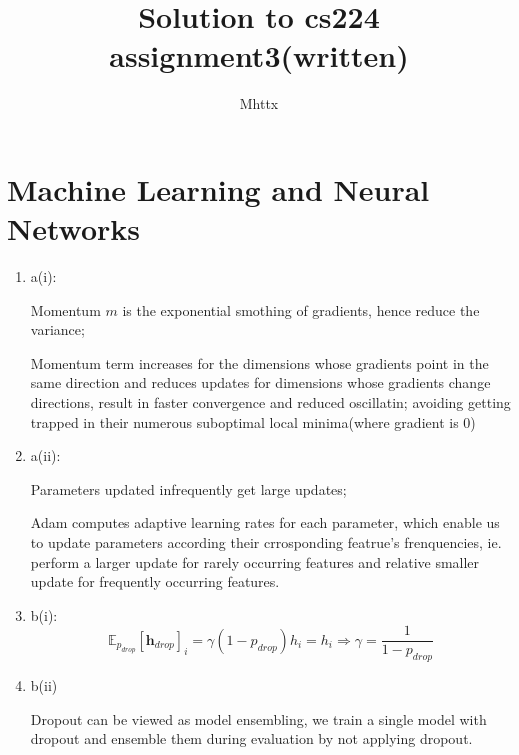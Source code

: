 \documentclass[a4paper]{article}
\begin{document}
\author{Mhttx}
\title{Solution to cs224 assignment3(written)}
\maketitle

\medskip
\section{Machine Learning and  Neural Networks}
\begin{enumerate}
	\item a(i): 

	Momentum $m$ is the exponential smothing of gradients, hence reduce the variance;

	Momentum term increases for the dimensions whose gradients point in the same direction and reduces updates for dimensions whose gradients change directions, result in faster convergence and reduced oscillatin; avoiding getting trapped in their numerous suboptimal local minima(where gradient is 0)

	\item a(ii): 

	Parameters updated infrequently get large updates; 

	Adam computes adaptive learning rates for each parameter, which enable us to update parameters according their crrosponding featrue's frenquencies, ie. perform a larger update for rarely occurring features and relative smaller update for frequently occurring features.

	\item b(i): $$\mathbb{E}_{p_{drop}}[\mathbf{h}_{drop}]_i=\gamma (1-p_{drop})h_i=h_i \Rightarrow \gamma = \frac{1}{1-p_{drop}}$$

	\item b(ii) 

	Dropout can be viewed as model ensembling, we train a single model with dropout and ensemble them during evaluation by not applying dropout. 
\end{enumerate}
\end{document}
